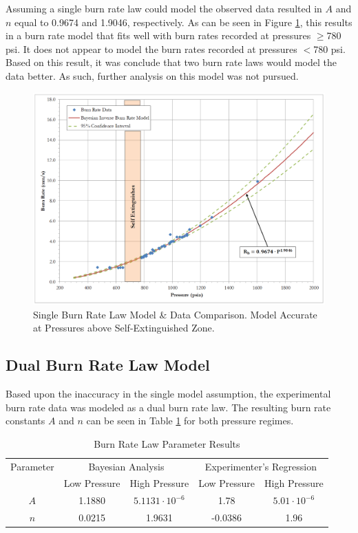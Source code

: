 \documentclass{article}
\begin{document}
Assuming a single burn rate law could model the observed data resulted in $A$ and $n$ equal 
to 0.9674 and 1.9046, respectively. As can be seen in Figure \ref{SingleBRfig}, this 
results in a burn rate model that fits well with burn rates recorded at pressures $\geq$780 psi.
It does not appear to model the burn rates recorded at pressures $<$780 psi. 
Based on this result, it was conclude that two burn rate laws would model the data better. 
As such, further analysis on this model was not pursued.

\begin{figure}[htb!]
\centering
\includegraphics[width=0.25\textheight]{Single_Burn_Rate_Results.png}
\caption{Single Burn Rate Law Model \& Data Comparison. Model Accurate at Pressures above Self-Extinguished Zone.}
\label{SingleBRfig}
\end{figure}

\subsection{Dual Burn Rate Law Model} \label{twoBurnRateResults}

Based upon the inaccuracy in the single model assumption, the experimental burn rate data was modeled
as a dual burn rate law. The resulting burn rate constants $A$ and $n$ can be seen in Table
\ref{Table:brlpresults} for both pressure regimes. 

\begin{table}
\centering
\caption{Burn Rate Law Parameter Results}
\label{Table:brlpresults}
\begin{tabular}{|c|c|c|c|c|}
\hline
Parameter & \multicolumn{2}{|c|}{Bayesian Analysis} & \multicolumn{2}{|c|}{Experimenter's Regression} \\ \cline{2-5}
 & Low Pressure & High Pressure & Low Pressure & High Pressure \\ \hline
$A$ & 1.1880 & $5.1131 \cdot 10^{-6}$ & 1.78 & $5.01 \cdot 10^{-6}$ \\ \hline
$n$ & 0.0215 & 1.9631 & -0.0386 & 1.96 \\
\hline
\end{tabular}
\end{table}
\end{document}
